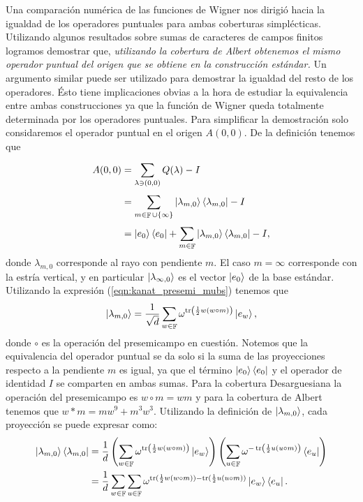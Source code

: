 \documentclass[a4paper, 11pt]{article}
\DeclareMathOperator{\F}{\mathbb{F}}
\DeclareMathOperator{\tr}{tr}
\begin{document}
  Una comparación numérica de las funciones de Wigner nos
  dirigió hacia la igualdad de los operadores puntuales para
  ambas coberturas simplécticas. Utilizando algunos
  resultados sobre sumas de caracteres de campos finitos
  logramos demostrar que, \textit{utilizando la cobertura de
  Albert obtenemos el mismo operador puntual del origen que
  se obtiene en la construcción estándar.}
  Un argumento similar puede ser utilizado para demostrar la
  igualdad del resto de los operadores. Ésto tiene
  implicaciones obvias a la hora de estudiar la equivalencia
  entre ambas construcciones ya que la función de Wigner
  queda totalmente determinada por los operadores puntuales.
  Para simplificar la demostración solo considaremos el
  operador puntual en el origen $A(0,0)$. De la definición
  tenemos que
  \begin{align}
    A(0,0)
    &= \sum_{\lambda \ni (0,0)}^{} Q(\lambda) - I \\
    &= \sum_{m \in \F \cup \{\infty\}}^{} \ket{\lambda_{m,0}}
    \bra{\lambda_{m,0}} - I \\
    &= \ket{e_0}\bra{e_0}
    + \sum_{m \in \F}^{}
    \ket{\lambda_{m,0}}\bra{\lambda_{m,0}} - I,
  \end{align}
  donde $\lambda_{m,0}$ corresponde al rayo con pendiente
  $m$. El caso $m = \infty$ corresponde con la estría
  vertical, y en particular $\ket{\lambda_{\infty,0}}$ es el
  vector $\ket{e_0}$ de la base estándar. Utilizando la
  expresión (\ref{eqn:kanat_presemi_mubs}) tenemos que
  \begin{equation}
    \ket{\lambda_{m,0}}
    = \frac{1}{\sqrt{d}} \sum_{w \in \F}^{}
    \omega^{\tr\left( \frac{1}{2} w(w\circ m) \right) }
    \ket{e_w},
  \end{equation}
  donde $\circ$ es la operación del presemicampo en
  cuestión. Notemos que la equivalencia del operador puntual
  se da solo si la suma de las proyecciones respecto a la
  pendiente $m$ es igual, ya que el término
  $\ket{e_0}\bra{e_0}$ y el operador de identidad $I$ se
  comparten en ambas sumas.  Para la cobertura Desarguesiana
  la operación del presemicampo es $w \circ m = wm$ y para
  la cobertura de Albert tenemos que $w * m = mw^{9} +
  m^3 w^3$.  Utilizando la definición de
  $\ket{\lambda_{m,0}}$, cada proyección se puede expresar
  como:
  \begin{align}
    \ket{\lambda_{m,0}} \bra{\lambda_{m,0}}
    &= \frac{1}{d} 
    \left(
      \sum_{w \in \F}^{} \omega^{\tr\left( \frac{1}{2}
      w(w\circ m) \right) }
      \ket{e_w}
    \right) 
    \left(
      \sum_{u \in \F}^{} \omega^{-\tr\left( \frac{1}{2}
      u(u \circ m) \right) }
      \bra{e_u}
    \right) \\
    &= \frac{1}{d}
    \sum_{w \in \F}^{} \sum_{u \in \F}^{} 
    \omega^{\tr( \frac{1}{2} w(w\circ m)) - \tr( \frac{1}{2}
    u(u \circ m))} 
    \ket{e_w} \bra{e_u}.
  \end{align}
\end{document}
